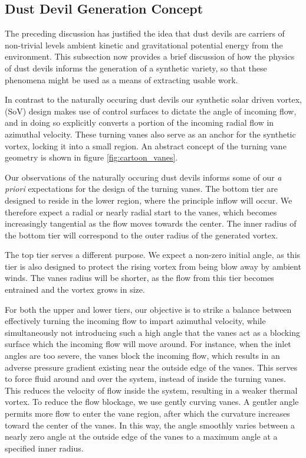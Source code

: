 \subsection{Dust Devil Generation Concept}

The preceding discussion has justified the idea that 
dust devils are carriers of non-trivial levels ambient kinetic and
gravitational potential energy from the environment. This  
subsection now provides a brief discussion of how the physics of 
dust devils informs the generation of a synthetic variety, so that these
phenomena might be used as a means of extracting usable work. 

In contrast to the naturally occuring dust devils
our synthetic solar driven vortex, (SoV) design makes use of
control surfaces to dictate the angle of incoming flow, and in doing so
explicitly converts a portion of the incoming radial flow in azimuthal
velocity. These turning vanes also serve as an anchor for the synthetic
vortex, locking it into a small region. An abstract concept of the turning
vane geometry is shown in figure \ref{fig:cartoon_vanes}.

Our observations of the naturally occuring dust devils informs some of
our \textit{a priori} expectations for the design of the turning
vanes. The bottom tier are designed to reside in the lower region, where
the principle inflow will occur. We therefore expect a radial or nearly
radial start to the vanes, which becomes increasingly tangential as the
flow moves towards the center. The inner radius of the bottom tier will
correspond to the outer radius of the generated vortex. 

The top tier serves a different purpose. We expect a non-zero initial
angle, as this tier is also designed to protect the rising vortex from
being blow away by ambient winds. The vanes radius will be shorter, as
the flow from this tier becomes entrained and the vortex grows in
size. 

For both the upper and lower tiers, our objective is to strike a balance
between effectively turning the incoming flow to impart azimuthal
velocity, while simultaneously not introducing such a high angle that
the vanes act as a blocking surface which the incoming flow will move
around. For instance, when the inlet angles are too severe, the vanes
block the incoming flow, which results in an adverse pressure gradient
existing near the outside edge of the 
vanes. This serves to force fluid around and over the system, instead
of inside the turning vanes. This reduces the velocity of flow inside
the system, resulting in a weaker thermal vortex.  To reduce
the flow blockage, we use gently curving vanes. A gentler angle permits
more flow to enter the vane region, after which the curvature increases
toward the center of the vanes. In this way, the angle smoothly varies
between a nearly zero angle at the outside edge of the vanes to a
maximum angle at a specified inner radius.

